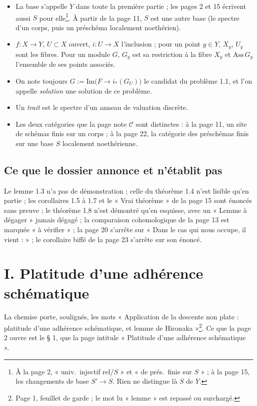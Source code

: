 \documentclass[11pt,a4paper]{article}
\begin{document}
\begin{itemize}
  \item La base s'appelle $Y$ dans toute la première partie ; les pages 2 et
  15 écrivent aussi $S$ pour elle\footnote{À la page 2, « univ.\ injectif
  rel/$S$ » et « de prés.\ finie sur $S$ » ; à la page 15, les changements de
  base $S' \to S$. Rien ne distingue là $S$ de $Y$.}. À partir de la page
  11, $S$ est une autre base (le spectre d'un corps, puis un préschéma
  localement noethérien).
  \item $f \colon X \to Y$, $U \subset X$ ouvert, $i \colon U \to X$
  l'inclusion ; pour un point $y \in Y$, $X_y$, $U_y$ sont les fibres. Pour
  un module $G$, $G_y$ est sa restriction à la fibre $X_y$ et
  $\mathrm{Ass}\, G_y$ l'ensemble de ses points associés.
  \item On note toujours $G := \mathrm{Im}\bigl(F \to i_*(G_U)\bigr)$ le
  candidat du problème 1.1, et l'on appelle \emph{solution} une solution de
  ce problème.
  \item Un \emph{trait} est le spectre d'un anneau de valuation discrète.
  \item Les deux catégories que la page note $\mathcal{C}$ sont distinctes :
  à la page 11, un site de schémas finis sur un corps ; à la page 22, la
  catégorie des préschémas finis sur une base $S$ localement noethérienne.
\end{itemize}

\subsection*{Ce que le dossier annonce et n'établit pas}

Le lemme 1.3 n'a pas de démonstration ; celle du théorème 1.4 n'est lisible
qu'en partie ; les corollaires 1.5 à 1.7 et le « Vrai théorème » de la page
15 sont énoncés sans preuve ; le théorème 1.8 n'est démontré qu'en esquisse,
avec un « Lemme à dégager » jamais dégagé ; la comparaison cohomologique de
la page 13 est marquée « à vérifier » ; la page 20 s'arrête sur « Dans le cas
qui nous occupe, il vient : » ; le corollaire biffé de la page 23 s'arrête
sur son énoncé.

\section*{I. Platitude d'une adhérence schématique}

La chemise porte, soulignés, les mots « Application de la descente non
plate : platitude d'une adhérence schématique, et lemme de
Hironaka »\footnote{Page 1, feuillet de garde ; le mot lu « lemme » est
repassé ou surchargé.}. Ce que la page 2 ouvre est le § 1, que la page
intitule « Platitude d'une adhérence schématique ».
\end{document}
